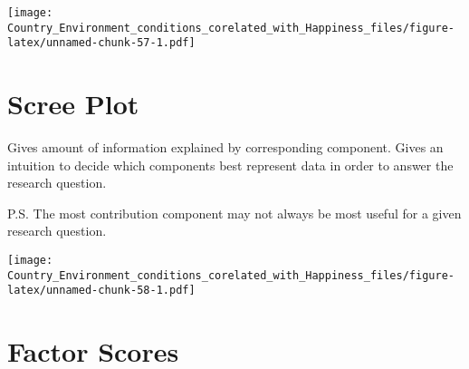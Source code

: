 \documentclass[]{book}
\newenvironment{Shaded}{\begin{snugshade}}{\end{snugshade}}
\newcommand{\CommentTok}[1]{\textcolor[rgb]{0.56,0.35,0.01}{\textit{#1}}}
\newcommand{\DataTypeTok}[1]{\textcolor[rgb]{0.13,0.29,0.53}{#1}}
\newcommand{\DecValTok}[1]{\textcolor[rgb]{0.00,0.00,0.81}{#1}}
\newcommand{\KeywordTok}[1]{\textcolor[rgb]{0.13,0.29,0.53}{\textbf{#1}}}
\newcommand{\NormalTok}[1]{#1}
\newcommand{\OperatorTok}[1]{\textcolor[rgb]{0.81,0.36,0.00}{\textbf{#1}}}
\newcommand{\StringTok}[1]{\textcolor[rgb]{0.31,0.60,0.02}{#1}}
\begin{document}
\begin{Shaded}
\end{Shaded}

\begin{Shaded}
\end{Shaded}

\texttt{[image: Country\_Environment\_conditions\_corelated\_with\_Happiness\_files/figure-latex/unnamed-chunk-57-1.pdf]}

\hypertarget{scree-plot-3}{%
\section{Scree Plot}\label{scree-plot-3}}

Gives amount of information explained by corresponding component. Gives
an intuition to decide which components best represent data in order to
answer the research question.

P.S. The most contribution component may not always be most useful for a
given research question.

\texttt{[image: Country\_Environment\_conditions\_corelated\_with\_Happiness\_files/figure-latex/unnamed-chunk-58-1.pdf]}

\hypertarget{factor-scores-2}{%
\section{Factor Scores}\label{factor-scores-2}}
\end{document}
